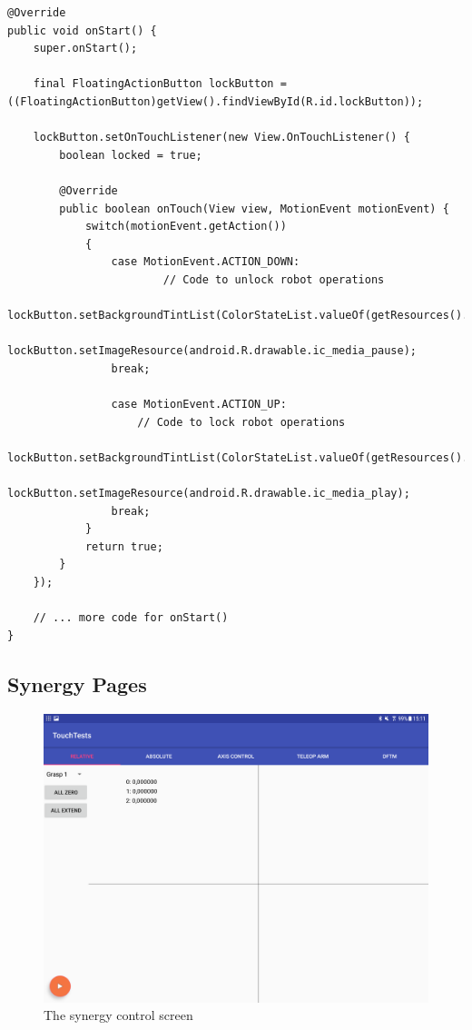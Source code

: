 \begin{lstlisting}[caption={Code for the interlock button}, label=lst:impl:interlock]
@Override
public void onStart() {
	super.onStart();
	
	final FloatingActionButton lockButton = ((FloatingActionButton)getView().findViewById(R.id.lockButton));

	lockButton.setOnTouchListener(new View.OnTouchListener() {
		boolean locked = true;
		
		@Override
		public boolean onTouch(View view, MotionEvent motionEvent) {
			switch(motionEvent.getAction())
			{
				case MotionEvent.ACTION_DOWN:
                        // Code to unlock robot operations
						lockButton.setBackgroundTintList(ColorStateList.valueOf(getResources().getColor(R.color.posOk)));
						lockButton.setImageResource(android.R.drawable.ic_media_pause);
				break;
				
				case MotionEvent.ACTION_UP:
					// Code to lock robot operations
					lockButton.setBackgroundTintList(ColorStateList.valueOf(getResources().getColor(R.color.posNOk)));
					lockButton.setImageResource(android.R.drawable.ic_media_play);
				break;
			}			
			return true;
		}
	});
	
	// ... more code for onStart()
}
\end{lstlisting}

\subsection{Synergy Pages}

\begin{figure}
	\caption{The synergy control screen\label{fig:ui:syn}}
	\includegraphics[width=\linewidth]{assets/chpt_impl/syn_blank}
\end{figure}

